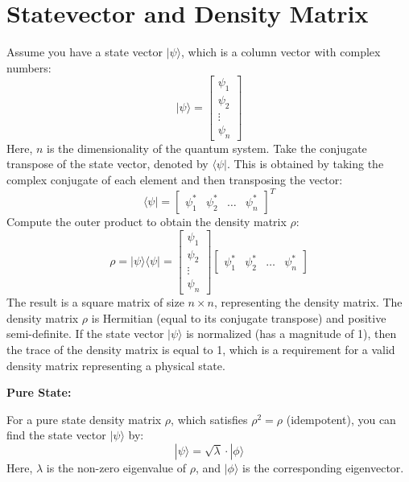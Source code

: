 \documentclass{article}
\begin{document}
\section{Statevector and Density Matrix} %
\label{sec:Statevector and Density Matrix}
Assume you have a state vector $|\psi\rangle$, which is a column vector with complex numbers:
\begin{equation}
	|\psi\rangle = \begin{bmatrix} \psi_1 \\ \psi_2 \\ \vdots \\ \psi_n \end{bmatrix}
\end{equation}
Here, $n$ is the dimensionality of the quantum system.
Take the conjugate transpose of the state vector, denoted by $\langle \psi|$. This is obtained by taking the complex conjugate of each element and then transposing the vector:
\begin{equation}
	\langle \psi| = \begin{bmatrix} \psi_1^* & \psi_2^* & \ldots & \psi_n^* \end{bmatrix}^T
\end{equation}
Compute the outer product to obtain the density matrix $\rho$:
\begin{equation}
	\rho = |\psi\rangle \langle \psi| = \begin{bmatrix} \psi_1 \\ \psi_2 \\ \vdots \\ \psi_n \end{bmatrix} \begin{bmatrix} \psi_1^* & \psi_2^* & \ldots & \psi_n^* \end{bmatrix}
\end{equation}
The result is a square matrix of size $n \times n$, representing the density matrix.
The density matrix $\rho$ is Hermitian (equal to its conjugate transpose) and positive semi-definite. If the state vector $|\psi\rangle$ is normalized (has a magnitude of 1), then the trace of the density matrix is equal to 1, which is a requirement for a valid density matrix representing a physical state.


\textbf{Pure State:}

For a pure state density matrix $\rho$, which satisfies $\rho^2 = \rho$ (idempotent), you can find the state vector $|\psi\rangle$ by:
\[ |\psi\rangle = \sqrt{\lambda} \cdot |\phi\rangle \]
Here, $\lambda$ is the non-zero eigenvalue of $\rho$, and $|\phi\rangle$ is the corresponding eigenvector.
\end{document}
